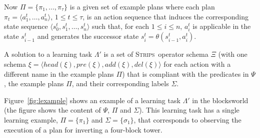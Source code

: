 \documentclass[letterpaper]{article} %
\newcommand{\tup}[1]{{\langle #1 \rangle}}
\newcommand{\strips}{\textsc{Strips}}     %
\begin{document}
Now $\Pi=\{\pi_1,\ldots,\pi_{\tau}\}$ is a given set of example plans where each plan $\pi_t=\tup{a_1^t, \ldots, a_n^t}$, {\small $1\leq t\leq \tau$}, is an action sequence that induces the corresponding state sequence $\tup{s_0^t, s_1^t, \ldots, s_n^t}$ such that, for each {\small $1\leq i\leq n$}, $a_i^t$ is applicable in the state $s_{i-1}^t$ and generates the successor state $s_i^t=\theta(s_{i-1}^t,a_i^t)$.

A solution to a learning task $\Lambda'$ is a set of \strips\ operator schema $\Xi$ (with one schema $\xi=\tup{head(\xi),pre(\xi),add(\xi),del(\xi)}$ for each action with a different name in the example plans $\Pi$) that is compliant with the predicates in $\Psi$, the example plans $\Pi$, and their corresponding labels $\Sigma$. 

Figure~\ref{fig:lexample} shows an example of a learning task $\Lambda'$ in the blocksworld (the figure shows the content of $\Psi$, $\Pi$ and $\Sigma$). This learning task has a single learning example, $\Pi=\{\pi_1\}$ and $\Sigma=\{\sigma_1\}$, that corresponds to observing the execution of a plan for inverting a four-block tower.
\end{document}
